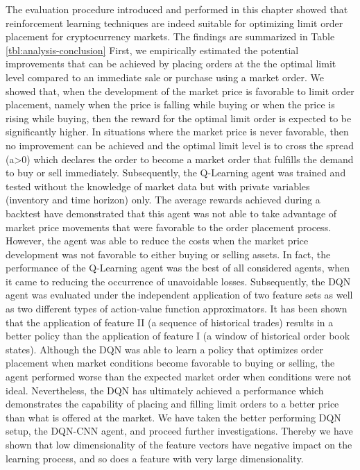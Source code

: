 The evaluation procedure introduced and performed in this chapter showed that reinforcement learning techniques are indeed suitable for optimizing limit order placement for cryptocurrency markets.
The findings are summarized in Table \ref{tbl:analysis-conclusion}
First, we empirically estimated the potential improvements that can be achieved by placing orders at the the optimal limit level compared to an immediate sale or purchase using a market order.
We showed that, when the development of the market price is favorable to limit order placement, namely when the price is falling while buying or when the price is rising while buying, then the reward for the optimal limit order is expected to be significantly higher.
In situations where the market price is never favorable, then no improvement can be achieved and the optimal limit level is to cross the spread (a>0) which declares the order to become a market order that fulfills the demand to buy or sell immediately.
Subsequently, the Q-Learning agent was trained and tested without the knowledge of market data but with private variables (inventory and time horizon) only.
The average rewards achieved during a backtest have demonstrated that this agent was not able to take advantage of market price movements that were favorable to the order placement process.
However, the agent was able to reduce the costs when the market price development was  not favorable to either buying or selling assets.
In fact, the performance of the Q-Learning agent was the best of all considered agents, when it came to reducing the occurrence of unavoidable losses.
Subsequently, the DQN agent was evaluated under the independent application of two feature sets as well as two different types of action-value function approximators.
It has been shown that the application of feature II (a sequence of historical trades) results in a better policy than the application of feature I (a window of historical order book states).
Although the DQN was able to learn a policy that optimizes order placement when market conditions become favorable to buying or selling, the agent performed worse than the expected market order when conditions were not ideal.
Nevertheless, the DQN has ultimately achieved a performance which demonstrates the capability of placing and filling limit orders to a better price than what is offered at the market.
We have taken the better performing DQN setup, the DQN-CNN agent, and proceed further investigations.
Thereby we have shown that low dimensionality of the feature vectors have negative impact on the learning process, and so does a feature with very large dimensionality.
